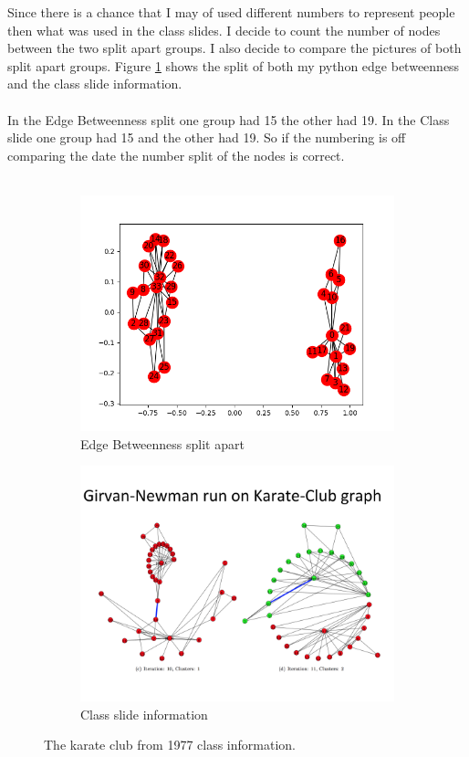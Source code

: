 \documentclass[10pt,letterpaper]{article}
\begin{document}
Since there is a chance that I may of used different numbers to represent people then what was used in the class slides.  I decide to count the number of nodes between the two split apart groups. I also decide to compare the pictures of both split apart groups.  Figure \ref{fig:comp2} shows the split of both my python edge betweenness and the class slide information.\\
\\
In the Edge Betweenness split one group had 15 the other had 19.
In the Class slide one group had 15 and the other had 19.  
So if the numbering is off comparing the date the number split of the nodes is correct.\\
\\
\begin{figure}[H]
  \centering
  \begin{subfigure}[b]{0.4\linewidth}
     \includegraphics[width=\linewidth]{karate12.png}
     \caption{Edge Betweenness split apart}
  \end{subfigure}
  \begin{subfigure}[b]{0.4\linewidth}
     \includegraphics[width=\linewidth]{slide104.png} 
     \caption{Class slide information}
  \end{subfigure}
  \caption{The karate club from 1977 class information.}
  \label{fig:comp2}
\end{figure}
\end{document}
